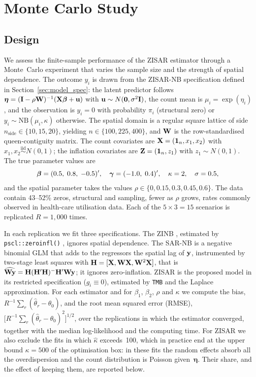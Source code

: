 \section{Monte Carlo Study}\label{sec:montecarlo}

\subsection{Design}\label{sec:mc_design}

We assess the finite-sample performance of the ZISAR estimator through a Monte~Carlo experiment that varies the sample size and the strength of spatial dependence.
The outcome $y_i$ is drawn from the ZISAR-NB specification defined in Section~\ref{sec:model_spec}: the latent predictor follows $\boldsymbol{\eta} = (\mathbf{I} - \rho\mathbf{W})^{-1}(\mathbf{X}\boldsymbol{\beta} + \mathbf{u})$ with $\mathbf{u} \sim N(\mathbf{0},\sigma^2\mathbf{I})$, the count mean is $\mu_i = \exp(\eta_i)$, and the observation is $y_i = 0$ with probability $\pi_i$ (structural zero) or $y_i \sim \mathrm{NB}(\mu_i,\kappa)$ otherwise.
The spatial domain is a regular square lattice of side $n_{\text{side}} \in \{10, 15, 20\}$, yielding $n \in \{100, 225, 400\}$, and $\mathbf{W}$ is the row-standardised queen-contiguity matrix.
The count covariates are $\mathbf{X} = (\mathbf{1}_n, x_1, x_2)$ with $x_1,x_2 \overset{\mathrm{iid}}{\sim} N(0,1)$; the inflation covariates are $\mathbf{Z} = (\mathbf{1}_n, z_1)$ with $z_1 \sim N(0,1)$.
The true parameter values are
\[
  \boldsymbol{\beta} = (0.5,\; 0.8,\; -0.5)', \quad
  \boldsymbol{\gamma} = (-1.0,\; 0.4)', \quad
  \kappa = 2, \quad
  \sigma = 0.5,
\]
and the spatial parameter takes the values $\rho \in \{0, 0.15, 0.3, 0.45, 0.6\}$.
The data contain 43--52\% zeros, structural and sampling, fewer as $\rho$ grows, rates commonly observed in health-care utilisation data.
Each of the $5 \times 3 = 15$ scenarios is replicated $R = 1{,}000$ times.

In each replication we fit three specifications.
The ZINB \citep{cameron_trivedi2013}, estimated by \texttt{pscl::zeroinfl()} \citep{pscl}, ignores spatial dependence.
The SAR-NB is a negative binomial GLM that adds to the regressors the spatial lag of $\mathbf{y}$, instrumented by two-stage least squares with $\mathbf{H} = [\mathbf{X}, \mathbf{W}\mathbf{X}, \mathbf{W}^2\mathbf{X}]$, that is $\widehat{\mathbf{W}\mathbf{y}} = \mathbf{H}(\mathbf{H}'\mathbf{H})^{-}\mathbf{H}'\mathbf{W}\mathbf{y}$; it ignores zero-inflation.
ZISAR is the proposed model in its restricted specification ($g_i \equiv 0$), estimated by \texttt{TMB} and the Laplace approximation.
For each estimator and for $\beta_1$, $\beta_2$, $\rho$ and $\kappa$ we compute the bias, $R^{-1}\sum_{r}(\hat{\theta}_r - \theta_0)$, and the root mean squared error (RMSE), $\bigl[R^{-1}\sum_{r}(\hat{\theta}_r - \theta_0)^2\bigr]^{1/2}$, over the replications in which the estimator converged, together with the median log-likelihood and the computing time.
For ZISAR we also exclude the fits in which $\hat\kappa$ exceeds~100, which in practice end at the upper bound $\kappa = 500$ of the optimisation box: in these fits the random effects absorb all the overdispersion and the count distribution is Poisson given~$\boldsymbol\eta$.
Their share, and the effect of keeping them, are reported below.

